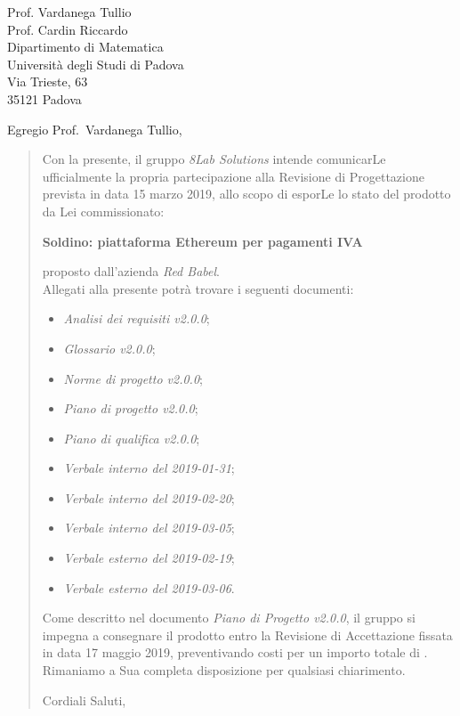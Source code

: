
\begin{letter}{
		Prof. Vardanega Tullio \\
		Prof. Cardin Riccardo \\
		Dipartimento di Matematica \\
		Università degli Studi di Padova \\
		Via Trieste, 63 \\
		35121 Padova}
		
\opening{Egregio Prof.~Vardanega Tullio,}

\begin{quotation}
Con la presente, il gruppo \textit{8Lab Solutions} intende 
comunicarLe ufficialmente la propria partecipazione alla Revisione di 
Progettazione prevista in data 15 marzo 2019, allo scopo di 
esporLe lo stato del prodotto da Lei commissionato:

\begin{center}
	\textbf{Soldino: piattaforma Ethereum per pagamenti IVA}
\end{center}

\noindent proposto dall'azienda \textit{Red Babel}. \\
Allegati alla presente potrà trovare i seguenti documenti:

\begin{itemize}
	\item \textit{Analisi dei requisiti v2.0.0};
	
	\item \textit{Glossario v2.0.0};
	
	\item \textit{Norme di progetto v2.0.0};

	\item \textit{Piano di progetto v2.0.0};

	\item \textit{Piano di qualifica v2.0.0};

	\item \textit{Verbale interno del 2019-01-31};
	\item \textit{Verbale interno del 2019-02-20};
	\item \textit{Verbale interno del 2019-03-05};
	\item \textit{Verbale esterno del 2019-02-19};
	\item \textit{Verbale esterno del 2019-03-06}.
\end{itemize}

\noindent Come descritto nel documento \textit{Piano di Progetto v2.0.0}, il 
gruppo si impegna a consegnare il prodotto entro la Revisione di Accettazione 
fissata in data 17 maggio 2019, preventivando costi per un importo 
totale di \textbf{}.\\
Rimaniamo a Sua completa disposizione per qualsiasi chiarimento.

\vspace{0.15cm}
\closing{ Cordiali Saluti,}
	

\end{quotation}
		
\end{letter}

